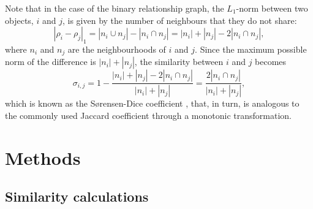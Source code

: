 \documentclass{kais}
\newcommand{\rn}[1]{\rho_{#1}}
\newcommand{\sy}[1]{\sigma_{#1}}
\newcommand{\dnm}[2]{|\rn{#1}-\rn{#2}|_1}
\begin{document}
Note that in the case of the binary relationship graph, the $L_1$-norm between two objects, $i$ and $j$, is given by the 
number of neighbours that they do not share:
\begin{equation}
\dnm{i}{j} = |n_i \cup n_j| - |n_i \cap n_j| = |n_i| + |n_j| - 2 |n_i \cap n_j|,
\label{eq:binarynorm}
\end{equation}
where $n_i$ and $n_j$ are the neighbourhoods of $i$ and $j$. Since the maximum possible norm of the difference is $|n_i| + |n_j|$, 
the similarity between $i$ and $j$ becomes
\begin{equation}
\sy{i,j} = 1 - \frac{|n_i| + |n_j| - 2 |n_i \cap n_j|}{|n_i| + |n_j|} = \frac{2 |n_i \cap n_j|}{|n_i| + |n_j|},
\label{eq:binaryrelnorm}
\end{equation}
which is known as the S{\o}rensen-Dice coefficient \cite{Dice45,Sorensen48}, that, in turn, is analogous to the commonly 
used Jaccard coefficient \cite{Jaccard1912} through a monotonic transformation.

\section{Methods}
\label{sec:methods}

\subsection{Similarity calculations}
\label{sec:similaritycalculations}
\end{document}
